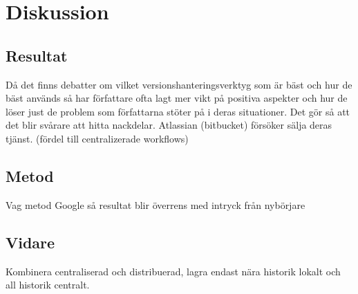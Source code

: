 \section{Diskussion}
\label{sec:bjorn-discussion}



\subsection{Resultat}
\label{subsec:bjorn-discussion-results}
Då det finns debatter om vilket versionshanteringsverktyg som är bäst och hur de bäst används så har författare ofta lagt mer vikt på positiva aspekter och hur de löser just de problem som författarna stöter på i deras situationer. Det gör så att det blir svårare att hitta nackdelar.
Atlassian (bitbucket) försöker sälja deras tjänst. (fördel till centralizerade workflows)


\subsection{Metod}
\label{subsec:bjorn-discussion-method}
Vag metod
Google så resultat blir överrens med intryck från nybörjare


\subsection{Vidare}
\label{subsec:bjorn-discussion-future}
Kombinera centraliserad och distribuerad, lagra endast nära historik lokalt och all historik centralt.	